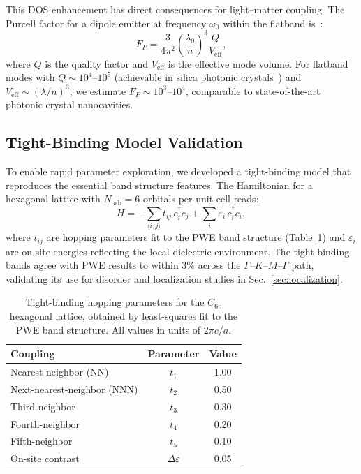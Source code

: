 \documentclass[10pt,letterpaper]{article}
\begin{document}
This DOS enhancement has direct consequences for light--matter coupling. The Purcell factor for a dipole emitter at frequency $\omega_0$ within the flatband is~\cite{Akahane2003}:
\begin{equation}
	F_P = \frac{3}{4\pi^2}\left(\frac{\lambda_0}{n}\right)^3 \frac{Q}{V_\mathrm{eff}},
	\label{eq:purcell}
\end{equation}
where $Q$ is the quality factor and $V_\mathrm{eff}$ is the effective mode volume. For flatband modes with $Q \sim 10^4$--$10^5$ (achievable in silica photonic crystals~\cite{Akahane2003,Vuckovic2002}) and $V_\mathrm{eff} \sim (\lambda/n)^3$, we estimate $F_P \sim 10^3$--$10^4$, comparable to state-of-the-art photonic crystal nanocavities.

\subsection{Tight-Binding Model Validation}

To enable rapid parameter exploration, we developed a tight-binding model that reproduces the essential band structure features. The Hamiltonian for a hexagonal lattice with $N_\mathrm{orb} = 6$ orbitals per unit cell reads:
\begin{equation}
	H = -\sum_{\langle i,j \rangle} t_{ij}\,c_i^\dagger c_j + \sum_i \varepsilon_i\,c_i^\dagger c_i,
	\label{eq:tightbinding}
\end{equation}
where $t_{ij}$ are hopping parameters fit to the PWE band structure (Table~\ref{tab:hopping}) and $\varepsilon_i$ are on-site energies reflecting the local dielectric environment. The tight-binding bands agree with PWE results to within 3\% across the $\Gamma$--$K$--$M$--$\Gamma$ path, validating its use for disorder and localization studies in Sec.~\ref{sec:localization}.

\begin{table}[h]
	\centering
	\caption{Tight-binding hopping parameters for the $C_{6v}$ hexagonal lattice, obtained by least-squares fit to the PWE band structure. All values in units of $2\pi c/a$.}
	\label{tab:hopping}
	\begin{tabular}{lcc}
		\toprule
		\textbf{Coupling}           & \textbf{Parameter}  & \textbf{Value} \\
		\midrule
		Nearest-neighbor (NN)       & $t_1$               & 1.00           \\
		Next-nearest-neighbor (NNN) & $t_2$               & 0.50           \\
		Third-neighbor              & $t_3$               & 0.30           \\
		Fourth-neighbor             & $t_4$               & 0.20           \\
		Fifth-neighbor              & $t_5$               & 0.10           \\
		On-site contrast            & $\Delta\varepsilon$ & 0.05           \\
		\bottomrule
	\end{tabular}
\end{table}
\end{document}

